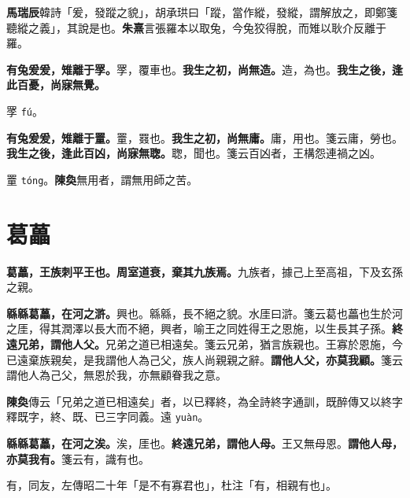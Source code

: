 \begin{quoting}\textbf{馬瑞辰}韓詩「爰，發蹤之貌」，胡承珙曰「蹤，當作縱，發縱，謂解放之，即鄭箋聽縱之義」，其說是也。\textbf{朱熹}言張羅本以取兔，今兔狡得脫，而雉以耿介反離于羅。\end{quoting}

\textbf{有兔爰爰，雉離于罦。}{\footnotesize 罦，覆車也。}\textbf{我生之初，尚無造。}{\footnotesize 造，為也。}\textbf{我生之後，逢此百憂，尚寐無覺。}

\begin{quoting}罦 \texttt{fú}。\end{quoting}

\textbf{有兔爰爰，雉離于罿。}{\footnotesize 罿，罬也。}\textbf{我生之初，尚無庸。}{\footnotesize 庸，用也。箋云庸，勞也。}\textbf{我生之後，逢此百凶，尚寐無聦。}{\footnotesize 聦，聞也。箋云百凶者，王構怨連禍之凶。}

\begin{quoting}罿 \texttt{tóng}。\textbf{陳奐}無用者，謂無用師之苦。\end{quoting}

\section{葛藟}


\textbf{葛藟，王族刺平王也。周室道衰，棄其九族焉。}{\footnotesize 九族者，據己上至高祖，下及玄孫之親。}

\textbf{緜緜葛藟，在河之滸。}{\footnotesize 興也。緜緜，長不絕之貌。水厓曰滸。箋云葛也藟也生於河之厓，得其潤澤以長大而不絕，興者，喻王之同姓得王之恩施，以生長其子孫。}\textbf{終遠兄弟，謂他人父。}{\footnotesize 兄弟之道已相遠矣。箋云兄弟，猶言族親也。王寡於恩施，今已遠棄族親矣，是我謂他人為己父，族人尚親親之辭。}\textbf{謂他人父，亦莫我顧。}{\footnotesize 箋云謂他人為己父，無恩於我，亦無顧眷我之意。}

\begin{quoting}\textbf{陳奐}傳云「兄弟之道已相遠矣」者，以已釋終，為全詩終字通訓，既醉傳又以終字釋既字，終、既、已三字同義。遠 \texttt{yuàn}。\end{quoting}

\textbf{緜緜葛藟，在河之涘。}{\footnotesize 涘，厓也。}\textbf{終遠兄弟，謂他人母。}{\footnotesize 王又無母恩。}\textbf{謂他人母，亦莫我有。}{\footnotesize 箋云有，識有也。}

\begin{quoting}有，同友，左傳昭二十年「是不有寡君也」，杜注「有，相親有也」。\end{quoting}


